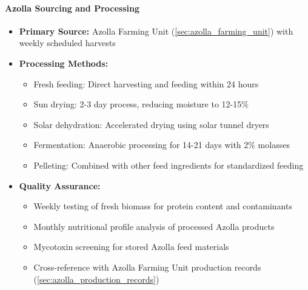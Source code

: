 \paragraph{Azolla Sourcing and Processing}
\begin{itemize}
    \item \textbf{Primary Source:} Azolla Farming Unit (\ref{sec:azolla_farming_unit}) with weekly scheduled harvests
    \item \textbf{Processing Methods:}
    \begin{itemize}
        \item Fresh feeding: Direct harvesting and feeding within 24 hours
        \item Sun drying: 2-3 day process, reducing moisture to 12-15\%
        \item Solar dehydration: Accelerated drying using solar tunnel dryers
        \item Fermentation: Anaerobic processing for 14-21 days with 2\% molasses
        \item Pelleting: Combined with other feed ingredients for standardized feeding
    \end{itemize}
    \item \textbf{Quality Assurance:}
    \begin{itemize}
        \item Weekly testing of fresh biomass for protein content and contaminants
        \item Monthly nutritional profile analysis of processed Azolla products
        \item Mycotoxin screening for stored Azolla feed materials
        \item Cross-reference with Azolla Farming Unit production records (\ref{sec:azolla_production_records})
    \end{itemize}
\end{itemize}

